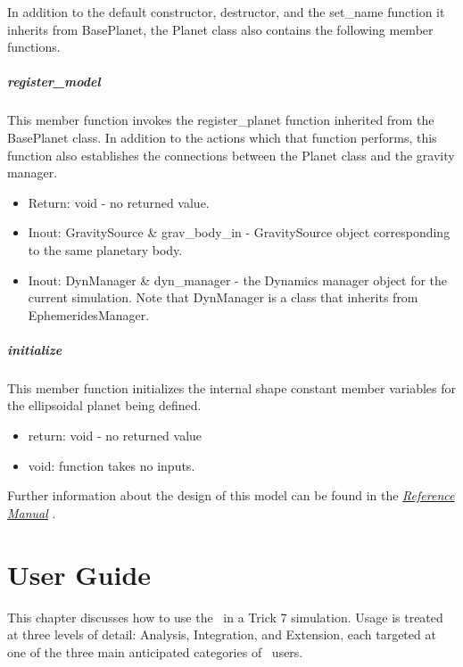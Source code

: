 In addition to the default constructor, destructor, and the set\_name function
it inherits from BasePlanet, the Planet class also contains the following
member functions.

\paragraph{register\_model}

This member function invokes the register\_planet function
inherited from the BasePlanet class. In addition to the actions which that
function performs, this function also establishes the connections between the
Planet class and the gravity manager.

\begin{itemize}
\item{Return:} void - no returned value.
\item{Inout:} GravitySource \& grav\_body\_in - GravitySource object corresponding
to the same planetary body.
\item{Inout:} DynManager \& dyn\_manager - the Dynamics manager object for
the current simulation. Note that DynManager is a class that inherits from
EphemeridesManager.
\end{itemize}

\paragraph{initialize}

This member function initializes the internal shape constant member variables
for the ellipsoidal planet being defined.

\begin{itemize}
\item{return:} void - no returned value
\item{void:} function takes no inputs.
\end{itemize}

Further information about the design of this model can be found
in the  \href{file:refman.pdf} {\em Reference Manual}
\cite{planetbib:ReferenceManual}.







\chapter{User Guide}\label{ch:user}
This chapter discusses how to use the \planetDesc\ in a Trick 7
simulation. Usage is treated at three levels of detail: Analysis,
Integration, and Extension, each targeted at one of the three main anticipated
categories of \JEODid\ users.

